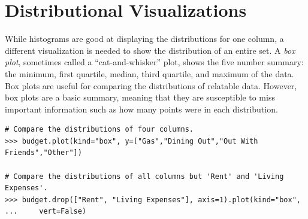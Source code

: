 \section*{Distributional Visualizations} %

While histograms are good at displaying the distributions for one column, a different visualization is needed to show the distribution of an entire set.
A \emph{box plot}, sometimes called a ``cat-and-whisker'' plot, shows the five number summary: the minimum, first quartile, median, third quartile, and maximum of the data.
Box plots are useful for comparing the distributions of relatable data.
However, box plots are a basic summary, meaning that they are susceptible to  miss important information such as how many points were in each distribution.

\begin{lstlisting}
# Compare the distributions of four columns.
>>> budget.plot(kind="box", y=["Gas","Dining Out","Out With Friends","Other"])

# Compare the distributions of all columns but 'Rent' and 'Living Expenses'.
>>> budget.drop(["Rent", "Living Expenses"], axis=1).plot(kind="box", 
...		vert=False)
\end{lstlisting}

